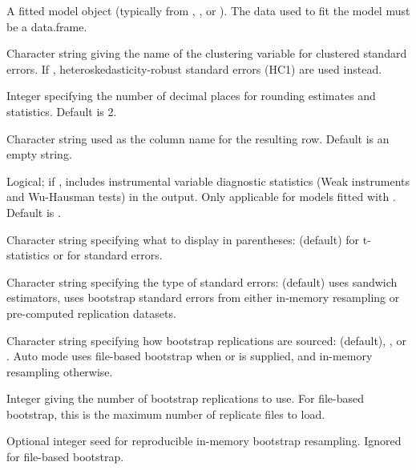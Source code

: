 \documentclass[a4paper]{book}
\begin{document}
\begin{Arguments}
\begin{ldescription}
\item[\code{my\_lm}] A fitted model object (typically from , ,
or ). The data used to fit the model must be a data.frame.

\item[\code{clust\_id}] Character string giving the name of the clustering variable
for clustered standard errors. If , heteroskedasticity-robust
standard errors (HC1) are used instead.

\item[\code{iv\_round}] Integer specifying the number of decimal places for rounding
estimates and statistics. Default is 2.

\item[\code{NAME}] Character string used as the column name for the resulting row.
Default is an empty string.

\item[\code{iv}] Logical; if , includes instrumental variable diagnostic
statistics (Weak instruments and Wu-Hausman tests) in the output. Only
applicable for models fitted with . Default is .

\item[\code{inParens}] Character string specifying what to display in parentheses:
 (default) for t-statistics or  for standard errors.

\item[\code{seType}] Character string specifying the type of standard errors:
 (default) uses sandwich estimators,  uses
bootstrap standard errors from either in-memory resampling or pre-computed
replication datasets.

\item[\code{bootstrap\_source}] Character string specifying how bootstrap replications
are sourced:  (default), , or .
Auto mode uses file-based bootstrap when  or
 is supplied, and in-memory resampling otherwise.

\item[\code{bootstrap\_reps}] Integer giving the number of bootstrap replications to
use. For file-based bootstrap, this is the maximum number of replicate
files to load.

\item[\code{bootstrap\_seed}] Optional integer seed for reproducible in-memory
bootstrap resampling. Ignored for file-based bootstrap.


\end{ldescription}
\end{Arguments}
\end{document}
